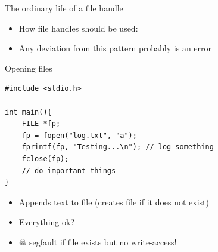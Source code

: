 \documentclass{beamer}
\newcommand{\inlineC}[1]{\lstinline[language=C]$#1$}
\begin{document}
\begin{frame}{The ordinary life of a file handle}
\begin{itemize}
\item How file handles should be used:
\end{itemize}
%
\begin{itemize}
\item Any deviation from this pattern probably is an error
\end{itemize}
\end{frame}

\begin{frame}[fragile]{Opening files}
\begin{lstlisting}
#include <stdio.h>

int main(){
    FILE *fp;
    fp = fopen("log.txt", "a");
    fprintf(fp, "Testing...\n"); // log something
    fclose(fp);
    // do important things
}
\end{lstlisting}
\begin{itemize}
\item Appends text to file (creates file if it does not exist)
\item Everything ok?
\pause
\item $\skull$ segfault if file exists but no write-access!
\end{itemize}
\end{frame}
\end{document}
